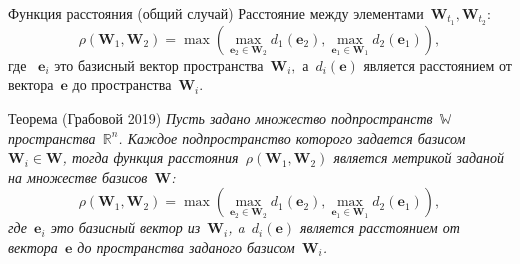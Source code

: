 \documentclass[10pt,pdf,hyperref={unicode}]{beamer}
\begin{document}
\begin{frame}[shrink=5]{Функция расстояния (общий случай)}
Расстояние между элементами~$\mathbf{W}_{t_1},\mathbf{W}_{t_2}$:\\
$$\rho\left(\textbf{W}_1, \textbf{W}_2\right) = \max\left(\max_{\textbf{e}_2 \in \textbf{W}_2} d_{1}\left(\textbf{e}_2\right), \max_{\textbf{e}_1 \in \textbf{W}_1} d_{2}\left(\textbf{e}_1\right)\right),$$
где ~$\textbf{e}_i$ это базисный вектор пространства~$\textbf{W}_i,$ а~$d_i\left(\textbf{e}\right)$ является расстоянием от вектора~$\textbf{e}$ до пространства~$\textbf{W}_i$.

\begin{block}{Теорема (Грабовой 2019)}
\textit{Пусть задано множество подпространств~$\mathbb{W}$ пространства~$\mathbb{R}^{n}$. Каждое подпространство которого задается базисом~$\mathbf{W}_i\in \mathbf{W}$, тогда функция расстояния~$\rho\left(\textbf{W}_1, \textbf{W}_2\right)$ является метрикой заданой на множестве базисов~$\mathbf{W}$:
$$
\rho\left(\textbf{W}_1, \textbf{W}_2\right) = \max\left(\max_{\textbf{e}_2 \in \textbf{W}_2} d_{1}\left(\textbf{e}_2\right), \max_{\textbf{e}_1 \in \textbf{W}_1} d_{2}\left(\textbf{e}_1\right)\right),
$$
где~$\textbf{e}_i$ это базисный вектор из~$\textbf{W}_i$, a~$d_i\left(\textbf{e}\right)$ является расстоянием от вектора~$\textbf{e}$ до пространства заданого базисом~$\textbf{W}_i$.
}
\end{block}
\end{frame}
\end{document}
